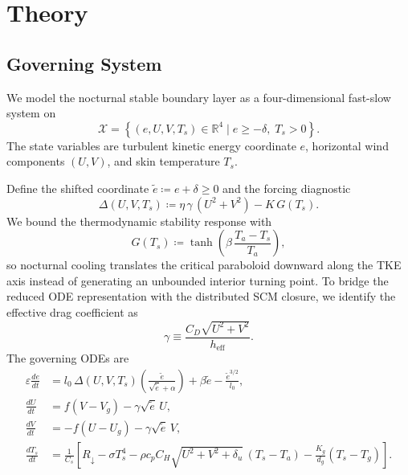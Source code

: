 \documentclass[11pt,letterpaper]{article}
\begin{document}

\section{Theory}
\subsection{Governing System}
\label{subsec:governing_system_unified}

We model the nocturnal stable boundary layer as a four-dimensional fast-slow system on
\begin{equation}
\mathcal{X} = \left\{(e,U,V,T_s) \in \mathbb{R}^4 \mid e \ge -\delta,\; T_s > 0\right\}.
\end{equation}
The state variables are turbulent kinetic energy coordinate $e$, horizontal wind components $(U,V)$, and skin temperature $T_s$.

Define the shifted coordinate $\tilde e \coloneqq e+\delta \ge 0$ and the forcing diagnostic
\begin{equation}
\Delta(U,V,T_s) \coloneqq \eta\,\gamma\,(U^2+V^2)-K\,G(T_s).
\end{equation}
We bound the thermodynamic stability response with
\begin{equation}
G(T_s) \coloneqq \tanh\!\left(\beta\,\frac{T_a-T_s}{T_a}\right),
\end{equation}
so nocturnal cooling translates the critical paraboloid downward along the TKE axis instead of generating an unbounded interior turning point.
To bridge the reduced ODE representation with the distributed SCM closure, we identify the effective drag coefficient as
\begin{equation}
\gamma \equiv \frac{C_D\sqrt{U^2+V^2}}{h_{\mathrm{eff}}}.
\end{equation}
The governing ODEs are
\begin{align}
\varepsilon \frac{de}{dt} &= l_0\,\Delta(U,V,T_s)\left(\frac{\tilde e}{\sqrt{\tilde e}+\alpha}\right) + \beta\tilde e - \frac{\tilde e^{3/2}}{l_0}, \label{eq:gspt_fast}\\
\frac{dU}{dt} &= f(V-V_g) - \gamma\sqrt{\tilde e}\,U, \label{eq:gspt_slow_u}\\
\frac{dV}{dt} &= -f(U-U_g) - \gamma\sqrt{\tilde e}\,V, \label{eq:gspt_slow_v}\\
\frac{dT_s}{dt} &= \frac{1}{C_s}\left[R_{\downarrow} - \sigma T_s^4 - \rho c_p C_H\sqrt{U^2+V^2+\delta_u}\,(T_s-T_a) - \frac{K_g}{d_g}(T_s-T_g)\right]. \label{eq:gspt_slow_ts}
\end{align}
\end{document}
